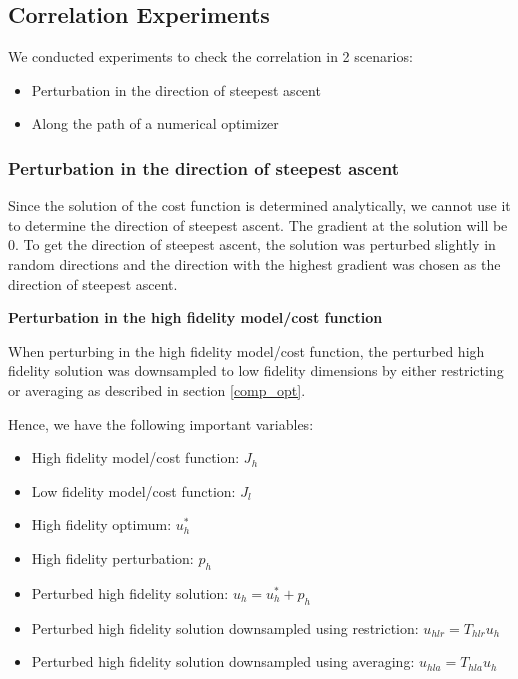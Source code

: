 \documentclass{article}
\begin{document}
\subsection{Correlation Experiments}

We conducted experiments to check the correlation in 2 scenarios:
\begin{itemize}
  \item Perturbation in the direction of steepest ascent
  \item Along the path of a numerical optimizer
\end{itemize}

\subsubsection{Perturbation in the direction of steepest ascent}

Since the solution of the cost function is determined analytically, we cannot use it to determine the direction of steepest ascent.
The gradient at the solution will be 0. To get the direction of steepest ascent, the solution was perturbed slightly in random directions and the direction with the highest gradient
was chosen as the direction of steepest ascent.

\textbf{Perturbation in the high fidelity model/cost function}

When perturbing in the high fidelity model/cost function, the perturbed high fidelity solution was downsampled to low fidelity
dimensions by either restricting or averaging as described in section \ref{comp_opt}.

Hence, we have the following important variables:

\begin{itemize}
  \item High fidelity model/cost function: $J_h$
  \item Low fidelity model/cost function: $J_l$
  \item High fidelity optimum: $u_h^*$
  \item High fidelity perturbation: $p_h$
  \item Perturbed high fidelity solution: $u_h = u_h^* + p_h$
  \item Perturbed high fidelity solution downsampled using restriction: $u_{hlr} = T_{hlr} u_h$
  \item Perturbed high fidelity solution downsampled using averaging: $u_{hla} = T_{hla} u_h$
\end{itemize}
\end{document}
